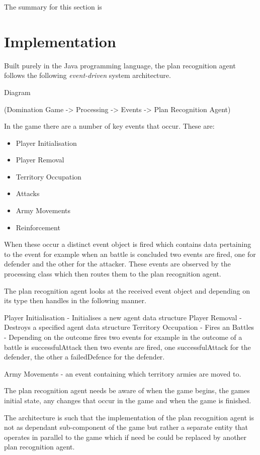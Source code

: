 \documentclass[parskip]{cs4rep}
\begin{document}
The summary for this section is

\chapter{Implementation}

Built purely in the Java programming language, the plan recognition agent follows the following \textit{event-driven} system architecture.

Diagram 

(Domination Game -> Processing -> Events -> Plan Recognition Agent)

In the game there are a number of key events that occur. These are:

\begin{itemize}
\item
Player Initialisation
\item
Player Removal
\item
Territory Occupation
\item
Attacks
\item
Army Movements
\item
Reinforcement
\end{itemize}

When these occur a distinct event object is fired which contains data pertaining to the event for example when an battle is concluded two events are fired, one for defender and the other for the attacker. These events are observed by the processing class which then routes them to the plan recognition agent. 

The plan recognition agent looks at the received event object and depending on its type then handles in the following manner.

Player Initialisation - Initialises a new agent data structure
Player Removal - Destroys a specified agent data structure
Territory Occupation - Fires an
Battles - Depending on the outcome fires two events for example in the outcome of a battle is successfulAttack then two events are fired, one successfulAttack for the defender, the other a failedDefence for the defender.

Army Movements - an event containing which territory armies are moved to.

The plan recognition agent needs be aware of when the game begins, the games initial state, any changes that occur in the game and when the game is finished.

The architecture is such that the implementation of the plan recognition agent is not as dependant sub-component of the game but rather a separate entity that operates in parallel to the game which if need be could be replaced by another plan recognition agent.
\end{document}
